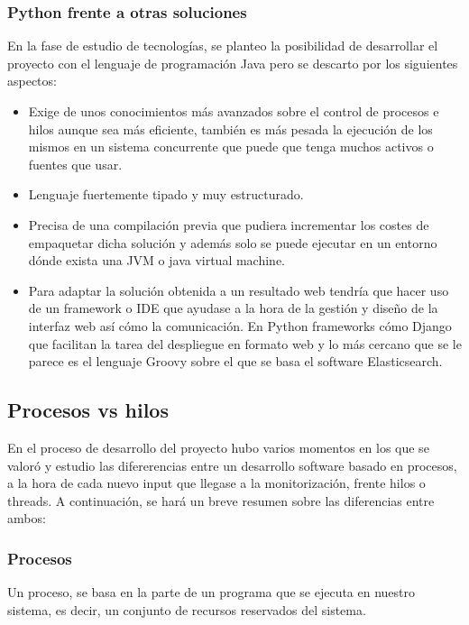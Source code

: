 \subsubsection{Python frente a otras soluciones}

En la fase de estudio de tecnologías, se planteo la posibilidad de desarrollar el proyecto con el lenguaje de programación Java pero se descarto por los siguientes aspectos:

\begin{itemize}
\item Exige de unos conocimientos más avanzados sobre el control de procesos e hilos aunque sea más eficiente, también es más pesada la ejecución de los mismos en un sistema concurrente que puede que tenga muchos activos o fuentes que usar.
\item Lenguaje fuertemente tipado y muy estructurado.
\item Precisa de una compilación previa que pudiera incrementar los costes de empaquetar dicha solución y además solo se puede ejecutar en un entorno dónde exista una JVM o java virtual machine.
\item Para adaptar la solución obtenida a un resultado web tendría que hacer uso de un framework o IDE que ayudase a la hora de la gestión y diseño de la interfaz web así cómo la comunicación. En Python frameworks cómo Django que facilitan la tarea del despliegue en formato web y lo más cercano que se le parece es el lenguaje Groovy sobre el que se basa el software Elasticsearch.
\end{itemize}

\subsection{Procesos vs hilos}

En el proceso de desarrollo del proyecto hubo varios momentos en los que se valoró y estudio las difererencias entre un desarrollo software basado en procesos, a la hora de cada nuevo input que llegase a la monitorización, frente hilos o threads. A continuación, se hará un breve resumen sobre las diferencias entre ambos:

\subsubsection{Procesos}

Un proceso, se basa en la parte de un programa que se ejecuta en nuestro sistema, es decir, un conjunto de recursos reservados del sistema.

